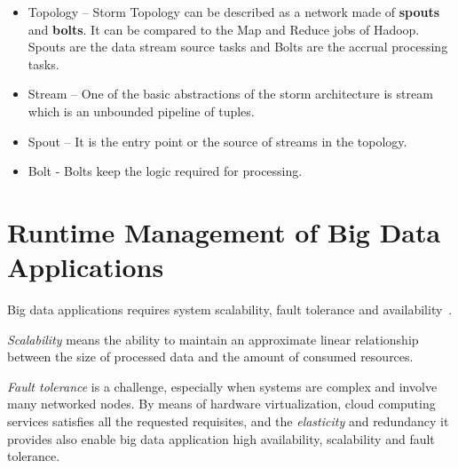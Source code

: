 \begin{itemize}
	\item Topology – Storm Topology can be described as a network made of \textbf{spouts} and \textbf{bolts}. It can be compared to the Map and Reduce jobs of Hadoop. Spouts are the data stream source tasks and Bolts are the accrual processing tasks.%
	\item Stream – One of the basic abstractions of the storm architecture is stream which is an unbounded pipeline of tuples.%
	\item Spout – It is the entry point or the source of streams in the topology. %
	\item Bolt - Bolts keep the logic required for processing. %
\end{itemize}

\section{Runtime Management of Big Data Applications}\label{sec:runtime_mgmt_big_data_apps}
Big data applications requires system scalability, fault tolerance and  availability~\cite{articleBigData:2017}. 

\textit{Scalability} means the ability to maintain an approximate linear relationship between the size of processed data and the amount of consumed resources. 

\textit{Fault tolerance} is a challenge, especially when systems are complex and involve many networked nodes. By means of hardware virtualization, cloud computing services satisfies all the requested requisites, and the \textit{elasticity} and redundancy it provides  also enable big data application high availability, scalability and fault tolerance.

